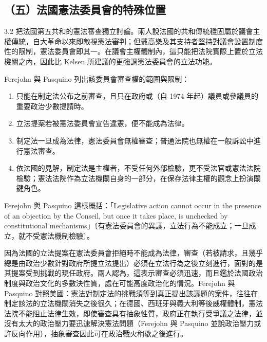 \subsection{（五）法國憲法委員會的特殊位置}

3.2 把法國第五共和的憲法審查獨立討論。兩人說法國的共和傳統穩固屬於議會主權傳統，自大革命以來即敵視憲法審判；但戴高樂及其支持者堅持對議會設置制度性的限制，憲法委員會即其一。在議會主權體制內，這只能把法院實際上置於立法機關之內，因此比 Kelsen 所建議的更強調憲法委員會的立法功能。

Ferejohn 與 Pasquino 列出該委員會審查權的範圍與限制：

\begin{enumerate}
\def\labelenumi{\arabic{enumi}.}
\tightlist
\item
  只能在制定法公布之前審查，且只在政府或（自 1974 年起）議員或參議員的重要政治少數提請時。
\item
  立法提案若被憲法委員會宣告違憲，便不能成為法律。
\item
  制定法一旦成為法律，憲法委員會無權審查；普通法院也無權在一般訴訟中進行憲法審查。
\item
  依法國的見解，制定法是主權者，不受任何外部檢驗，更不受法官或憲法法院檢驗；憲法法院作為立法機關自身的一部分，在保存法律主權的觀念上扮演關鍵角色。
\end{enumerate}

Ferejohn 與 Pasquino 這樣概括：「Legislative action cannot occur in the presence of an objection by the Conseil, but once it takes place, is unchecked by constitutional mechanisms」〔有憲法委員會的異議，立法行為不能成立；一旦成立，就不受憲法機制檢驗〕。

因為法國的立法提案在憲法委員會拒絕時不能成為法律，審查（若被請求，且幾乎總是由政治少數針對政府所提立法提出）必須在立法行為之後立刻進行，面對的是其提案受到挑戰的現任政府。兩人認為，這表示審查必須迅速，而且鑑於法國政治制度與政治文化的多數決性質，處在可能高度政治化的情況。Ferejohn 與 Pasquino 對照美國：憲法對制定法的挑戰須等到真正提出該議題的案件，往往在制定該法的立法機關消失之後很久；在德國、西班牙與義大利等後威權體制，憲法法院不能阻止法律生效，即使審查具有抽象性質，政府正在執行受爭議之法律，並沒有太大的政治壓力要迅速解決憲法問題（Ferejohn 與 Pasquino 並說政治壓力或許反向作用），抽象審查因此可在政治戰火稍歇之後進行。

